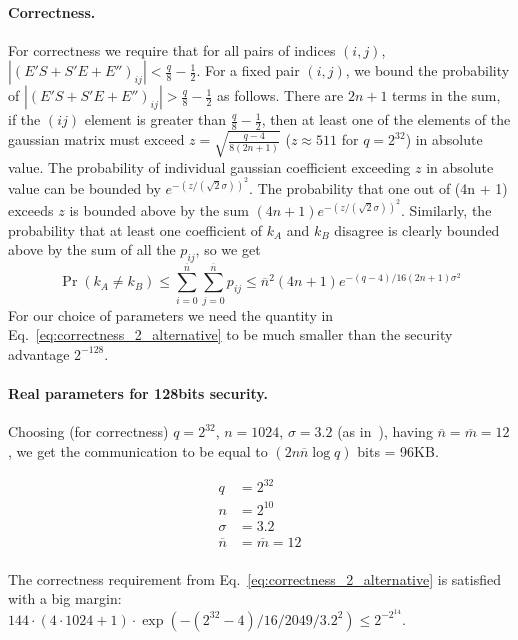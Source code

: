 \documentclass[12pt]{article}
\newcommand{\nbar}{\overline{n}}
\newcommand{\mbar}{\overline{m}}
\begin{document}
\paragraph{Correctness.} For correctness we require that for all pairs of indices $(i, j)$, $|(E'S + S'E + E'')_{ij}| < \frac{q}{8} - \frac{1}{2}$. For a fixed pair $(i, j)$, we bound the probability of $|(E'S + S'E + E'')_{ij}| > \frac{q}{8} - \frac{1}{2}$ as follows. There are $2n + 1$ terms in the sum, if the $(ij)$ element is greater than $\frac{q}{8} - \frac{1}{2}$, then at least one of the elements of the gaussian matrix must exceed $z = \sqrt{\frac{q - 4}{8 (2n + 1)}}$ ($z \approx 511$ for $q = 2^{32}$) in absolute value. The probability of individual gaussian coefficient exceeding $z$ in absolute value can be bounded by $e^{-(z / (\sqrt{2}\sigma))^2}$. The probability that one out of (4n + 1) exceeds $z$ is bounded above by the sum $(4n + 1)e^{-(z / (\sqrt{2}\sigma))^2}$. Similarly, the probability that at least one coefficient of $k_A$ and $k_B$ disagree is clearly bounded above by the sum of all the $p_{ij}$, so we get
\begin{equation}
\Pr(k_A \neq k_B) \leq \sum_{i = 0}^{\nbar} \sum_{j = 0}^{\nbar} p_{ij} \leq \nbar^2 (4n + 1)e^{-(q - 4)/ 16 (2n + 1)\sigma^2}
\label{eq:correctness_2_alternative}
\end{equation}
For our choice of parameters we need the quantity in Eq.~\ref{eq:correctness_2_alternative} to be much smaller than the security advantage $2^{-128}$.
 
\paragraph{Real parameters for 128bits security.}
Choosing (for correctness) $q = 2^{32}$, $n = 1024$, $\sigma = 3.2$ (as in~\cite{BCNS14}), having $\nbar = \mbar = 12$, we get the communication to be equal to $(2 n \nbar \log q)$ bits = 96KB.

\begin{equation*}
   \boxed{
   \begin{aligned}
     q &= 2^{32}\\
     n &= 2^{10}\\
     \sigma &= 3.2\\
     \nbar &= \mbar = 12\\
     \end{aligned}
}
\end{equation*}

The correctness requirement from Eq.~\ref{eq:correctness_2_alternative} is satisfied with a big margin: $144 \cdot (4 \cdot 1024 + 1) \cdot \exp(-(2^{32} - 4) / 16 / 2049 / 3.2^2) \leq 2^{-2^{14}}$.
\end{document}
